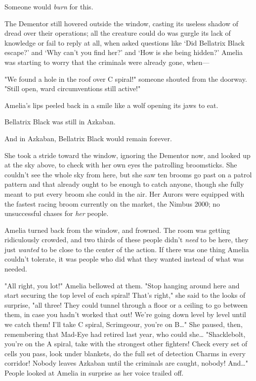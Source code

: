 Someone would \emph{burn} for this.

The Dementor still hovered outside the window, casting its useless shadow of 
dread over their operations; all the creature could do was gurgle its lack of 
knowledge or fail to reply at all, when asked questions like `Did Bellatrix 
Black escape?' and `Why can't you find her?' and `How is she being hidden?' 
Amelia was starting to worry that the criminals were already gone, when---

"We found a hole in the roof over C spiral!" someone shouted from the doorway. 
"Still open, ward circumventions still active!"

Amelia's lips peeled back in a smile like a wolf opening its jaws to eat.

Bellatrix Black was still in Azkaban.

And in Azkaban, Bellatrix Black would remain forever.

She took a stride toward the window, ignoring the Dementor now, and looked up 
at the sky above, to check with her own eyes the patrolling broomsticks. She 
couldn't see the whole sky from here, but she saw ten brooms go past on a 
patrol pattern and that already ought to be enough to catch anyone, though she 
fully meant to put every broom she could in the air. Her Aurors were equipped 
with the fastest racing broom currently on the market, the Nimbus 2000; no 
unsuccessful chases for \emph{her} people.

Amelia turned back from the window, and frowned. The room was getting 
ridiculously crowded, and two thirds of these people didn't \emph{need} to be 
here, they just \emph{wanted} to be close to the center of the action. If there 
was one thing Amelia couldn't tolerate, it was people who did what they wanted 
instead of what was needed.

"All right, you lot!" Amelia bellowed at them. "Stop hanging around here and 
start securing the top level of each spiral! That's right," she said to the 
looks of surprise, "all three! They could tunnel through a floor or a ceiling 
to go between them, in case you hadn't worked that out! We're going down level 
by level until we catch them! I'll take C spiral, Scrimgeour, you're on 
B{\ldots}" She paused, then, remembering that Mad-Eye had retired last year, 
who could she{\ldots} "Shacklebolt, you're on the A spiral, take with the 
strongest other fighters! Check every set of cells you pass, look under 
blankets, do the full set of detection Charms in every corridor! Nobody leaves 
Azkaban until the criminals are caught, nobody! And{\ldots}" People looked at 
Amelia in surprise as her voice trailed off.

